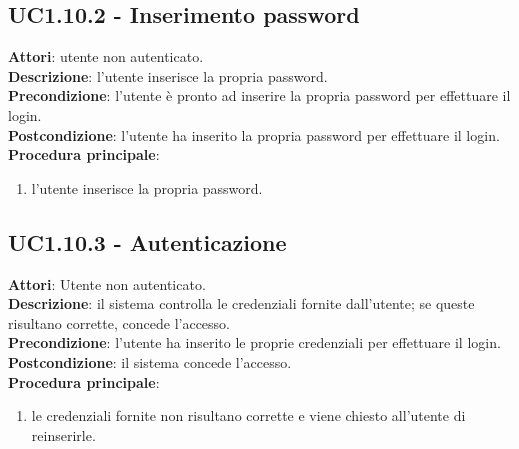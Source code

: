 	\subsection{UC1.10.2 - Inserimento password}{
		\label{uc1.10.2}
		\textbf{Attori}: utente non autenticato. \\
		\textbf{Descrizione}: l'utente  inserisce la propria password.	\\
		\textbf{Precondizione}: l'utente  è pronto ad inserire la propria password per effettuare il login.	\\
		\textbf{Postcondizione}: l'utente  ha inserito la propria password per effettuare il login.	\\
		\textbf{Procedura principale}:
		\begin{enumerate}
			\item l'utente  inserisce la propria password.
		\end{enumerate}
		}
	\subsection{UC1.10.3 - Autenticazione}{
		\label{uc1.10.3}
		\textbf{Attori}: Utente non autenticato.	\\
		\textbf{Descrizione}: il sistema controlla le credenziali fornite dall'utente; se queste risultano corrette, concede l'accesso.	\\
		\textbf{Precondizione}: l'utente  ha inserito le proprie credenziali per effettuare il login.	\\
		\textbf{Postcondizione}: il sistema concede l'accesso.	\\
		\textbf{Procedura principale}:
		\begin{enumerate}
			\item le credenziali fornite non risultano corrette e viene chiesto all'utente di reinserirle.
		\end{enumerate}
		}